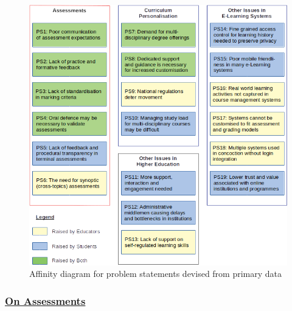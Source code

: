 \begin{figure}[!ht] 
    \centering    
    \includegraphics[width=1.0\textwidth]{ps-affinity}
    \caption[Affinity diagram for primary data]
        {Affinity diagram for problem statements devised from primary data}
    \label{fig:ps-affinity}
\end{figure}

\subsubsection{\underline{On Assessments}}

